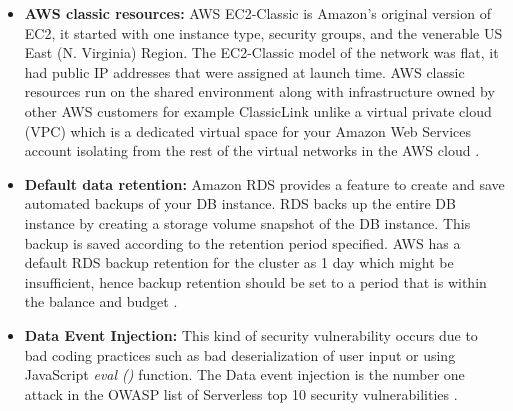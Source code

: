 \begin{itemize}
    \item \textbf{AWS classic resources:} AWS EC2-Classic is Amazon's original version of EC2,
    it started with one instance type, security groups, and the venerable US East (N. Virginia) Region.
    The EC2-Classic model of the network was flat, it had public IP addresses that were assigned at launch time.
    AWS classic resources run on the shared environment along with infrastructure owned by other AWS customers for
    example ClassicLink unlike a virtual private cloud
    (VPC) which is a dedicated virtual space for your Amazon Web Services account isolating from the rest of the virtual networks in the AWS cloud \cite{69}.
\end{itemize}

\begin{itemize}
    \item \textbf{Default data retention:} Amazon RDS provides a feature to create and save automated backups of your DB
    instance.
    RDS backs up the entire DB instance by creating a storage volume snapshot of the DB instance.
    This
    backup is saved according to the retention period specified.
    AWS has a default RDS backup retention for the
    cluster as 1 day which might be insufficient, hence backup retention should be set to a period that
    is within the balance and budget \cite{36} \cite{38}.
\end{itemize}

\begin{itemize}
    \item \textbf{Data Event Injection:} This kind of security vulnerability occurs due to bad coding practices such
    as bad
    deserialization of user input or using JavaScript \textit{eval ()} function.
    The Data event injection is the
    number
    one
    attack in the OWASP list of Serverless top 10
    security vulnerabilities \cite{68}.
\end{itemize}

